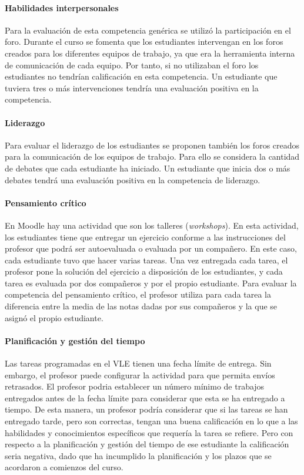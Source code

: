 \paragraph*{Habilidades interpersonales}
Para la evaluación de esta competencia genérica se utilizó la participación en el foro. Durante el curso se fomenta que los estudiantes intervengan en los foros creados para los diferentes equipos de trabajo, ya que era la herramienta interna de comunicación de cada equipo. Por tanto, si no utilizaban el foro los estudiantes no tendrían calificación en esta competencia. Un estudiante que tuviera tres o más intervenciones tendría una evaluación positiva en la competencia.

\paragraph*{Liderazgo}
Para evaluar el liderazgo de los estudiantes se proponen también los foros creados para la comunicación de los equipos de trabajo. Para ello se considera la cantidad de debates que cada estudiante ha iniciado. Un estudiante que inicia dos o más debates tendrá una evaluación positiva en la competencia de liderazgo.

\paragraph*{Pensamiento crítico}
En Moodle hay una actividad que son los talleres (\emph{workshops}). En esta actividad, los estudiantes tiene que entregar un ejercicio conforme a las instrucciones del profesor que podrá ser autoevaluada o evaluada por un compañero. En este caso, cada estudiante tuvo que hacer varias tareas. Una vez entregada cada tarea, el profesor pone la solución del ejercicio a disposición de los estudiantes, y cada tarea es evaluada por dos compañeros y por el propio estudiante. Para evaluar la competencia del pensamiento crítico, el profesor utiliza para cada tarea la diferencia entre la media de las notas dadas por sus compañeros y la que se asignó el propio estudiante.

\paragraph*{Planificación y gestión del tiempo}
Las tareas programadas en el VLE tienen una fecha límite de entrega. Sin embargo, el profesor puede configurar la actividad para que permita envíos retrasados. El profesor podria establecer un número mínimo de trabajos entregados antes de la fecha límite para considerar que esta se ha entregado a tiempo. De esta manera, un profesor podría considerar que si las tareas se han entregado tarde, pero son correctas, tengan una buena calificación en lo que a las habilidades y conocimientos específicos que requería la tarea se refiere. Pero con respecto a la planificación y gestión del tiempo de ese estudiante la calificación seria negativa, dado que ha incumplido la planificación y los plazos que se acordaron a comienzos del curso.

